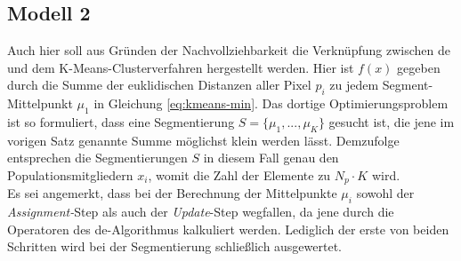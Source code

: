 		\subsection{Modell 2}
		\label{sub:model2}
			Auch hier soll aus Gründen der Nachvollziehbarkeit die Verknüpfung zwischen \gls{de} und dem K-Means-Clusterverfahren hergestellt werden. Hier ist $f(x)$ gegeben durch die Summe der euklidischen Distanzen aller Pixel $p_{i}$ zu jedem Segment-Mittelpunkt $\mu_{1}$ in Gleichung \ref{eq:kmeans-min}. Das dortige Optimierungsproblem ist so formuliert, dass eine Segmentierung $S = \{\mu_{1}, ..., \mu_{K}\}$ gesucht ist, die jene im vorigen Satz genannte Summe möglichst klein werden lässt. Demzufolge entsprechen die Segmentierungen $S$ in diesem Fall genau den Populationsmitgliedern $x_{i}$, womit die Zahl der Elemente zu $N_{p} \cdot K$ wird.\\
			Es sei angemerkt, dass bei der Berechnung der Mittelpunkte $\mu_{i}$ sowohl der \textit{Assignment-}Step als auch der \textit{Update}-Step wegfallen, da jene durch die Operatoren des \gls{de}-Algorithmus kalkuliert werden. Lediglich der erste von beiden Schritten wird bei der Segmentierung schließlich ausgewertet.